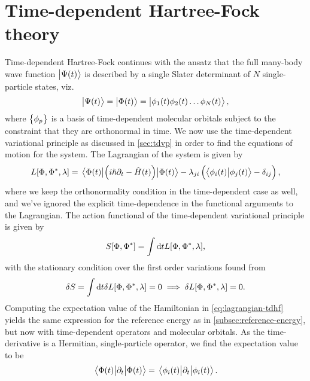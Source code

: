 \section{Time-dependent Hartree-Fock theory}
    Time-dependent Hartree-Fock continues with the ansatz that the full
    many-body wave function $\ket{\Psi(t)}$ is described by a single Slater
    determinant of $N$ single-particle states, viz.
    \begin{align}
        \ket{\Psi(t)} = \ket{\Phi(t)}
        = \ket{\phi_1(t) \phi_2(t)\dots \phi_N(t)},
    \end{align}
    where $\left\{ \phi_p \right\}$ is a basis of time-dependent molecular orbitals
    subject to the constraint that they are orthonormal in time.
    We now use the time-dependent variational principle as discussed in
    \autoref{sec:tdvp} in order to find the equations of motion for the system.
    The Lagrangian of the system is given by
    \begin{align}
        L[\Phi, \Phi^{*}, \lambda]
        = \mel{\Phi(t)}{\left( 
            i\hslash\partial_t
            - \hat{H}(t)
         \right)}{\Phi(t)}
        - \lambda_{ji}\left( 
            \braket{\phi_i(t)}{\phi_j(t)}
            - \delta_{ij}
         \right),
        \label{eq:lagrangian-tdhf}
    \end{align}
    where we keep the orthonormality condition in the time-dependent case as
    well, and we've ignored the explicit time-dependence in the functional
    arguments to the Lagrangian.
    The action functional of the time-dependent variational principle is given
    by
    \begin{align}
        S[\Phi, \Phi^{*}]
        =
        \int \dd t L[\Phi, \Phi^{*}, \lambda],
    \end{align}
    with the stationary condition over the first order variations found from
    \begin{align}
        \delta S
        = \int\dd t \delta L[\Phi, \Phi^{*}, \lambda]
        = 0
        \implies
        \delta L[\Phi, \Phi^{*}, \lambda]
        = 0.
    \end{align}
    Computing the expectation value of the Hamiltonian in
    \autoref{eq:lagrangian-tdhf} yields the same expression for the reference
    energy as in \autoref{subsec:reference-energy}, but now with time-dependent
    operators and molecular orbitals.
    As the time-derivative is a Hermitian, single-particle operator, we find the
    expectation value to be
    \begin{align}
        \mel{\Phi(t)}{\partial_t}{\Phi(t)}
        = \mel{\phi_i(t)}{\partial_t}{\phi_i(t)}.
    \end{align}

